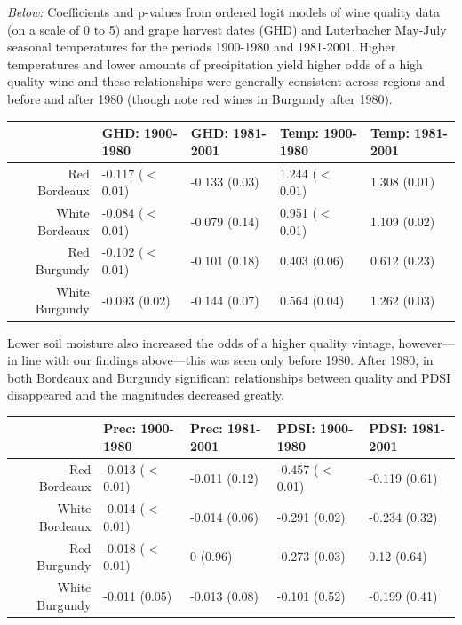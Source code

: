 \documentclass[portrait,a0,final] {a0poster} %
\begin{document}
\begin{multicols}{2}
\emph{Below:} Coefficients and p-values from ordered logit models of wine quality data (on a scale of 0 to 5) and grape harvest dates (GHD) and Luterbacher May-July seasonal temperatures for the periods 1900-1980 and 1981-2001. Higher temperatures and lower amounts of precipitation yield higher odds of a high quality wine and these relationships were generally consistent across regions and before and after 1980 (though note red wines in Burgundy after 1980). 
\begin{center}
\begin{tabular}{||r||l|l||l|l||}
  \hline
 & GHD: 1900-1980 & GHD: 1981-2001 & Temp: 1900-1980 & Temp: 1981-2001 \\ 
  \hline
Red Bordeaux & -0.117 ($<$0.01) & -0.133 (0.03) & 1.244 ($<$0.01) & 1.308 (0.01) \\ 
  White Bordeaux & -0.084 ($<$0.01) & -0.079 (0.14) & 0.951 ($<$0.01) & 1.109 (0.02) \\ 
  Red Burgundy & -0.102 ($<$0.01) & -0.101 (0.18) & 0.403 (0.06) & 0.612 (0.23) \\ 
  White Burgundy & -0.093 (0.02) & -0.144 (0.07) & 0.564 (0.04) & 1.262 (0.03) \\ 
   \hline
\end{tabular}
\end{center}
Lower soil moisture also increased the odds of a higher quality vintage, however---in line with our findings above---this was seen only before 1980. After 1980, in both Bordeaux and Burgundy significant relationships between quality and PDSI disappeared and the magnitudes decreased greatly.
\begin{center}
\begin{tabular}{||r||l|l||l|l||}
  \hline
 & Prec: 1900-1980 & Prec: 1981-2001 & PDSI: 1900-1980 & PDSI: 1981-2001 \\ 
  \hline
Red Bordeaux & -0.013 ($<$0.01) & -0.011 (0.12) & -0.457 ($<$0.01) & -0.119 (0.61) \\ 
  White Bordeaux & -0.014 ($<$0.01) & -0.014 (0.06) & -0.291 (0.02) & -0.234 (0.32) \\ 
  Red Burgundy & -0.018 ($<$0.01) & 0 (0.96) & -0.273 (0.03) & 0.12 (0.64) \\ 
  White Burgundy & -0.011 (0.05) & -0.013 (0.08) & -0.101 (0.52) & -0.199 (0.41) \\ 
   \hline
\end{tabular}
\end{center}


\end{multicols}
\end{document}
